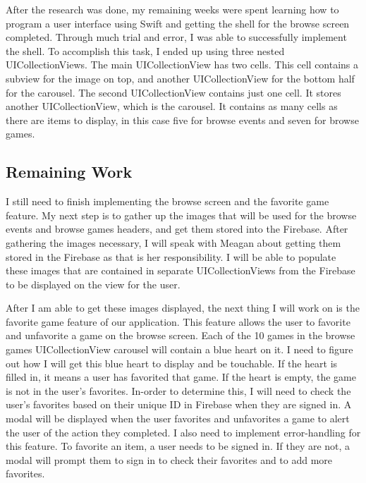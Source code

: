 \documentclass[onecolumn, draftclsnofoot,10pt, compsoc]{IEEEtran}
\begin{document}
\par After the research was done, my remaining weeks were spent learning how to program a user interface using Swift and getting the shell for the browse screen completed. Through much trial and error, I was able to successfully implement the shell. To accomplish this task, I ended up using three nested UICollectionViews. The main UICollectionView has two cells. This cell contains a subview for the image on top, and another UICollectionView for the bottom half for the carousel. The second UICollectionView contains just one cell. It stores another UICollectionView, which is the carousel. It contains as many cells as there are items to display, in this case five for browse events and seven for browse games.

\subsection{Remaining Work}
I still need to finish implementing the browse screen and the favorite game feature. My next step is to gather up the images that will be used for the browse events and browse games headers, and get them stored into the Firebase. After gathering the images necessary, I will speak with Meagan about getting them stored in the Firebase as that is her responsibility. I will be able to populate these images that are contained in separate UICollectionViews from the Firebase to be displayed on the view for the user.

\par After I am able to get these images displayed, the next thing I will work on is the favorite game feature of our application. This feature allows the user to favorite and unfavorite a game on the browse screen. Each of the 10 games in the browse games UICollectionView carousel will contain a blue heart on it. I need to figure out how I will get this blue heart to display and be touchable. If the heart is filled in, it means a user has favorited that game. If the heart is empty, the game is not in the user’s favorites. In-order to determine this, I will need to check the user’s favorites based on their unique ID in Firebase when they are signed in. A modal will be displayed when the user favorites and unfavorites a game to alert the user of the action they completed. I also need to implement error-handling for this feature. To favorite an item, a user needs to be signed in. If they are not, a modal will prompt them to sign in to check their favorites and to add more favorites. 
\end{document}
